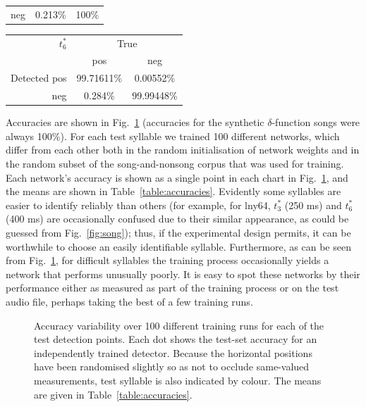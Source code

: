 \documentclass[10pt,letterpaper]{article}
\newcommand\fig[1]{Fig.~\ref{#1}}
\begin{document}
{\begin{tabular}{r|cc}
    neg & 0.213\% & 100\%\\ 
  \end{tabular}
  \vspace{8pt}\par\noindent
  \begin{tabular}{r|cc}
    $t^*_6$ & \multicolumn{2}{c}{True} \\ 
    & pos & neg \\ 
    \hline  Detected pos & 99.71611\% & 0.00552\%\\ 
    neg & 0.284\% & 99.99448\%\\ 
  \end{tabular}
  \vspace{8pt}\par\noindent
}

Accuracies are shown in \fig{fig:accuracies} (accuracies for the synthetic $\delta$-function
songs were always 100\%).  For each test syllable we trained 100
different networks, which differ from each other both in the random
initialisation of network weights and in the random subset of the
song-and-nonsong corpus that was used for training.  Each network's
accuracy is shown as a single point in each chart in
\fig{fig:accuracies}, and the means are shown in
Table~\ref{table:accuracies}.  Evidently some syllables are easier to
identify reliably than others (for example, for lny64, $t^*_3$ (250 ms) and $t^*_6$ (400 ms) are
occasionally confused due to their similar appearance, as could be
guessed from \fig{fig:song}); thus, if the experimental design
permits, it can be worthwhile to choose an easily identifiable
syllable.  Furthermore, as can be seen from \fig{fig:accuracies}, for
difficult syllables the training process occasionally yields a network
that performs unusually poorly.  It is easy to spot these networks by
their performance either as measured as part of the training process
or on the test audio file, perhaps taking the best of a few training
runs.

\begin{figure}
  
  \caption{Accuracy variability over 100 different training runs for
    each of the test detection points.  Each dot shows the test-set
    accuracy for an independently trained detector.  Because the
    horizontal positions have been randomised slightly so as not to
    occlude same-valued measurements, test syllable is also indicated
    by colour.  The means are given in Table~\ref{table:accuracies}.}
  \label{fig:accuracies}
\end{figure}
\end{document}
